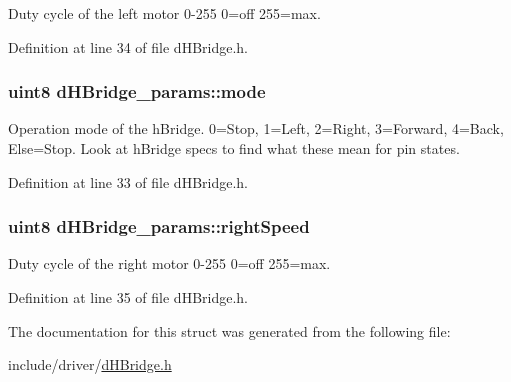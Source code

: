 Duty cycle of the left motor 0-\/255 0=off 255=max. 



Definition at line 34 of file d\-H\-Bridge.\-h.

\hypertarget{structd_h_bridge__params_aa0df512aa34374dd5f8a86b673840e52}{
\subsubsection[{mode}]{\setlength{\rightskip}{0pt plus 5cm}uint8 d\-H\-Bridge\-\_\-params\-::mode}}\label{structd_h_bridge__params_aa0df512aa34374dd5f8a86b673840e52}


Operation mode of the h\-Bridge. 0=Stop, 1=Left, 2=Right, 3=Forward, 4=Back, Else=Stop. Look at h\-Bridge specs to find what these mean for pin states. 



Definition at line 33 of file d\-H\-Bridge.\-h.

\hypertarget{structd_h_bridge__params_ad051173f1232b4056ec2b7c106b9385e}{
\subsubsection[{right\-Speed}]{\setlength{\rightskip}{0pt plus 5cm}uint8 d\-H\-Bridge\-\_\-params\-::right\-Speed}}\label{structd_h_bridge__params_ad051173f1232b4056ec2b7c106b9385e}


Duty cycle of the right motor 0-\/255 0=off 255=max. 



Definition at line 35 of file d\-H\-Bridge.\-h.



The documentation for this struct was generated from the following file\-:\begin{DoxyCompactItemize}
\item 
include/driver/\hyperlink{d_h_bridge_8h}{d\-H\-Bridge.\-h}\end{DoxyCompactItemize}
